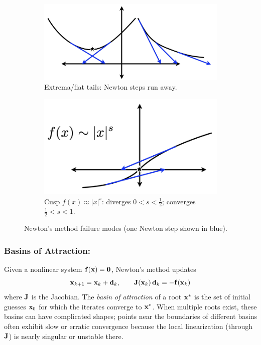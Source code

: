\begin{figure}[H]
    \centering
    \begin{subfigure}{0.48\linewidth}
    \centering
    \includegraphics[width=0.98\linewidth]{figs/nle/failuremode1.png}
    \caption{Extrema/flat tails: Newton steps run away.}
    \end{subfigure}\hfill
    \begin{subfigure}{0.48\linewidth}
    \centering
    \includegraphics[width=0.98\linewidth]{figs/nle/failuremode2.png}
    \caption{Cusp $f(x)\approx|x|^{s}$: diverges $0<s<\frac12$; converges $\frac12<s<1$.}
    \end{subfigure}
    
    \caption{Newton's method failure modes (one Newton step shown in blue).}
    \label{fig:failure-modes}
\end{figure}
    
\subsubsection{Basins of Attraction:}
\label{par:basins-of-attraction}
Given a nonlinear system \(\mathbf{f}(\mathbf{x})=\mathbf{0}\), Newton's method updates
\[
\mathbf{x}_{k+1}=\mathbf{x}_k+\mathbf{d}_k,\qquad
\mathbf{J}(\mathbf{x}_k)\,\mathbf{d}_k=-\mathbf{f}(\mathbf{x}_k)
\]
where \(\mathbf{J}\) is the Jacobian. The \emph{basin of attraction} of a root \(\mathbf{x}^*\) is the set of initial guesses \(\mathbf{x}_0\) for which the iterates converge to \(\mathbf{x}^*\). When multiple roots exist, these basins can have complicated shapes; points near the boundaries of different basins often exhibit slow or erratic convergence because the local linearization (through \(\mathbf{J}\)) is nearly singular or unstable there.

